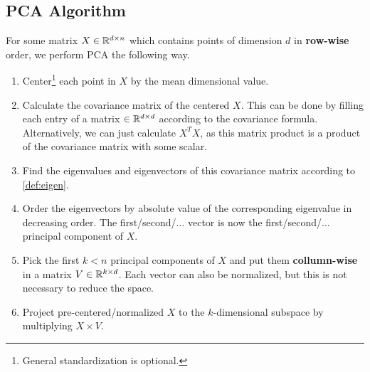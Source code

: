 \subsection{PCA Algorithm}
For some matrix \(X \in \mathbb R^{d \times n}\) which contains points of dimension \(d\) in \textbf{row-wise} order, we perform PCA the following way.
\begin{enumerate}
    \item Center\footnote{General standardization is optional.} each point in \(X\) by the mean dimensional value.

    \item Calculate the covariance matrix of the centered \(X\).
        This can be done by filling each entry of a matrix \(\in \mathbb R^{d \times d}\) according to the covariance formula.
        Alternatively, we can just calculate \(X^TX\), as this matrix product is a product of the covariance matrix with some scalar.

    \item Find the eigenvalues and eigenvectors of this covariance matrix according to \cref{def:eigen}.

    \item Order the eigenvectors by absolute value of the corresponding eigenvalue in decreasing order.
        The first/second/... vector is now the first/second/... principal component of \(X\).

    \item Pick the first \(k < n\) principal components of \(X\) and put them \textbf{collumn-wise} in a matrix \(V \in \mathbb R^{k \times d}\).
        Each vector can also be normalized, but this is not necessary to reduce the space.

    \item Project pre-centered/normalized \(X\) to the \(k\)-dimensional subspace by multiplying \(X \times V\).
\end{enumerate}

\begin{center}
\end{center}

